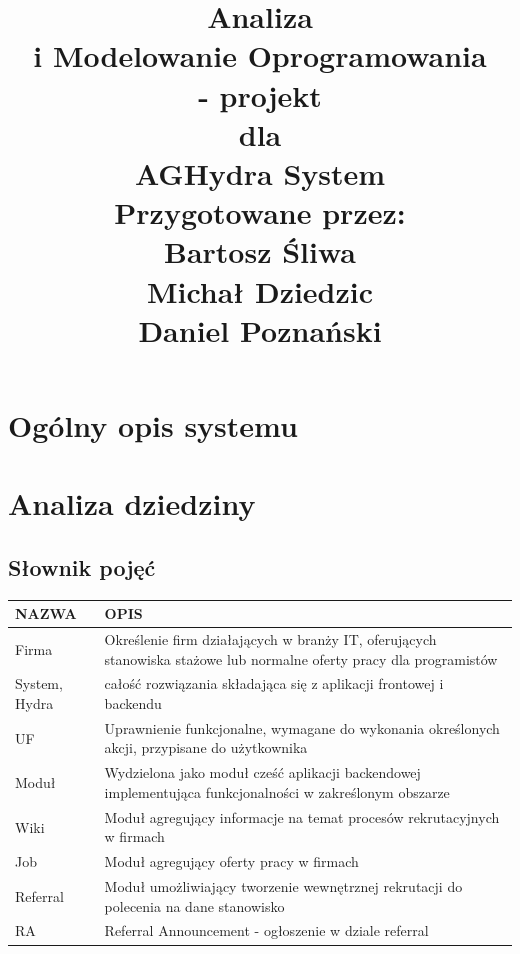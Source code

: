 \documentclass[oneside]{scrreprt}
\title{%
\flushright
\Huge{Analiza\\ i Modelowanie Oprogramowania \\ - projekt}\\
\vspace{2cm}
dla\\
\vspace{2cm}
AGHydra System\\
\vspace{2cm}
Przygotowane przez:\\
Bartosz Śliwa\\
Michał Dziedzic\\
Daniel Poznański\\
}
\date{}
\begin{document}
\maketitle
\tableofcontents
\chapter{Ogólny opis systemu}

\chapter{Analiza dziedziny}

\section{Słownik pojęć}
\begin{table}[ht]
	\centering
	\begin{tabular}{p{4cm}p{8cm}}
		\textbf{NAZWA}                     & \textbf{OPIS}                                                                                                       \\ \hline
		\multicolumn{1}{l|}{Firma}         & Określenie firm działających w branży IT, oferujących stanowiska stażowe lub normalne oferty pracy dla programistów \\ \hline
		\multicolumn{1}{l|}{System, Hydra} & całość rozwiązania składająca się z aplikacji frontowej i backendu                                                  \\ \hline
		\multicolumn{1}{l|}{UF}            & Uprawnienie funkcjonalne, wymagane do wykonania określonych akcji, przypisane do użytkownika                        \\ \hline
		\multicolumn{1}{l|}{Moduł}         & Wydzielona jako moduł cześć aplikacji backendowej implementująca funkcjonalności w zakreślonym obszarze             \\ \hline
		\multicolumn{1}{l|}{Wiki}          & Moduł agregujący informacje na temat procesów rekrutacyjnych w firmach                                              \\ \hline
		\multicolumn{1}{l|}{Job}           & Moduł agregujący oferty pracy w firmach                                                                             \\ \hline
		\multicolumn{1}{l|}{Referral}      & Moduł umożliwiający tworzenie wewnętrznej rekrutacji do polecenia na dane stanowisko                                \\ \hline
		\multicolumn{1}{l|}{RA}            & Referral Announcement - ogłoszenie w dziale referral                                                                \\ \hline
	\end{tabular}
\end{table}
\end{document}
